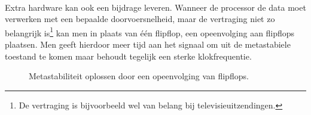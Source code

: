 \paragraph{}
Extra hardware kan ook een bijdrage leveren. Wanneer de processor de data moet verwerken met een bepaalde doorvoersnelheid, maar de vertraging niet zo belangrijk is\footnote{De vertraging is bijvoorbeeld wel van belang bij televisieuitzendingen.} kan men in plaats van \'e\'en flipflop, een opeenvolging aan flipflops plaatsen. Men geeft hierdoor meer tijd aan het signaal om uit de metastabiele toestand te komen maar behoudt tegelijk een sterke klokfrequentie.
\begin{figure}[hbt]
\centering
{}
\caption{Metastabiliteit oplossen door een opeenvolging van flipflops.}
\end{figure}
